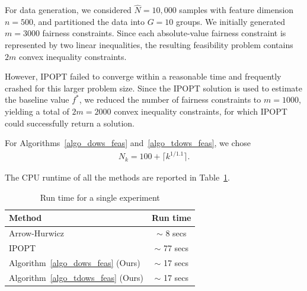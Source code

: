 \documentclass{article}
\theoremstyle{plain}
\theoremstyle{definition}
\theoremstyle{remark}
\begin{document}
For data generation, we considered $\widehat N = 10{,}000$ samples with feature dimension $n = 500$, and partitioned the data into $G = 10$ groups. We initially generated $m = 3000$ fairness constraints. Since each absolute-value fairness constraint is represented by two linear inequalities, the resulting feasibility problem contains $2m$ convex inequality constraints.

However, IPOPT failed to converge within a reasonable time and frequently crashed for this larger problem size. Since the IPOPT solution is used to estimate the baseline value $f^*$, we reduced the number of fairness constraints to $m = 1000$, yielding a total of $2m = 2000$ convex inequality constraints, for which IPOPT could successfully return a solution.

For Algorithms~\ref{algo_dows_feas} and~\ref{algo_tdows_feas}, we chose
\begin{align*}
N_k = 100 + \lceil k^{1/1.1} \rceil.
\end{align*}

The CPU runtime of all the methods are reported in Table~\ref{tab_runtime_fairness}.


\begin{table}[h!]
\centering
\caption{Run time for a single experiment}
\label{tab_runtime_fairness}
\begin{tabular}{l c}
\hline
\textbf{Method} & \textbf{Run time} \\
\hline
Arrow-Hurwicz & $\sim$ 8 secs \\
IPOPT & $\sim$ 77 secs \\
Algorithm~\ref{algo_dows_feas} (Ours) & $\sim$ 17 secs \\
Algorithm~\ref{algo_tdows_feas} (Ours) & $\sim$ 17 secs \\
\hline
\end{tabular}
\end{table}



\end{document}
